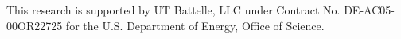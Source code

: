 \documentclass[final]{iucr}              %
\begin{document}






This research is supported by UT Battelle, LLC under Contract No.
DE-AC05-00OR22725 for the U.S. Department of Energy, Office of Science.



     
   






\end{document}
